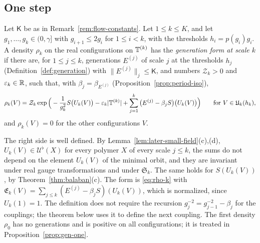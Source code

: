 \subsection{One step}\label{subsec:flow4-step}

\begin{definition}\label{def:gen-form}
Let $\mathsf K$ be as in Remark~\ref{rem:flow-constants}. Let $1\le k\le K$, and let $g_1,\dots,g_k\in(0,\gamma]$ with $g_{i+1}\le2g_i$ for $1\le i<k$, with the thresholds $h_i=p(g_i)g_i$. A density $\rho_k$ on the real configurations on $\mathbb T^{(k)}$ has the \emph{generation form at scale $k$} if there are, for $1\le j\le k$, generations $E^{(j)}$ of scale $j$ at the thresholds $h_j$ (Definition~\ref{def:generation}) with $\|E^{(j)}\|_j\le\mathsf K$, and numbers $\mathcal Z_k>0$ and $\varepsilon_k\in\mathbb R$, such that, with $\beta_j=\beta_{E^{(j)}}$ (Proposition~\ref{prop:period-iso}),
\[
\rho_k(V)=\mathcal Z_k\exp\Big(-\frac1{g_k^2}S\big(U_k(V)\big)-\varepsilon_k|\mathbb T^{(k)}|+\sum_{j=1}^k\big(E^{(j)}-\beta_jS\big)\big(U_k(V)\big)\Big)\qquad\text{for }V\in\mathfrak U_k(h_k),
\]
and $\rho_k(V)=0$ for the other configurations $V$.
\end{definition}

The right side is well defined. By Lemma~\ref{lem:later-small-field}(c),(d), $U_k(V)\in\mathcal U^\flat(X)$ for every polymer $X$ of every scale $j\le k$, the sums do not depend on the element $U_k(V)$ of the minimal orbit, and they are invariant under real gauge transformations and under $\mathfrak S_k$. The same holds for $S(U_k(V))$, by Theorem~\ref{thm:balaban}(c). The form is \eqref{eq:rho-k} with $\mathfrak E_k(V)=\sum_{j\le k}(E^{(j)}-\beta_jS)(U_k(V))$, which is normalized, since $U_k(1)=1$. The definition does not require the recursion $g_j^{-2}=g_{j-1}^{-2}-\beta_j$ for the couplings; the theorem below uses it to define the next coupling. The first density $\rho_0$ has no generations and is positive on all configurations; it is treated in Proposition~\ref{prop:gen-one}.

